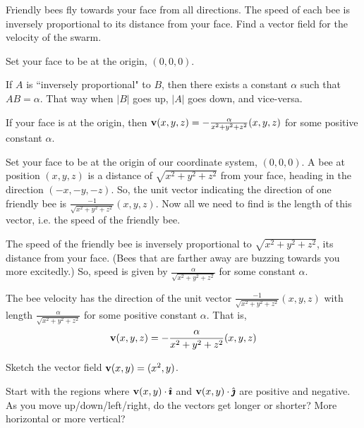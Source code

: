 \begin{question}
Friendly bees fly towards your face from all directions. The  speed of each bee is inversely proportional to its distance from your face.  Find a vector field for the velocity of the swarm.
\end{question}

\begin{hint} 
Set your face to be at the origin, $(0,0,0)$. 

If $A$ is ``inversely proportional" to $B$, then there exists a constant $\alpha$ such that $AB=\alpha$. That way when $|B|$ goes up, $|A|$ goes down, and vice-versa.
\end{hint}

\begin{answer} 
If your face is at the origin, then $\mathbf{v}(x,y,z)=-\frac{\alpha}{{x^2+y^2+z^2}}(x,y,z)$ for some positive constant $\alpha$.
\end{answer}

\begin{solution}
Set your face to be at the origin of our coordinate system, $(0,0,0)$. A bee at position $(x,y,z)$ is a distance of $\sqrt{x^2+y^2+z^2}$ from your face, heading in the direction $(-x,-y,-z)$. So, the unit vector indicating the direction of one friendly bee is $\frac{-1}{\sqrt{x^2+y^2+z^2}}(x,y,z)$. Now all we need to find is the length of this vector, i.e. the speed of the friendly bee.

The speed of the friendly bee is inversely proportional to $\sqrt{x^2+y^2+z^2}$, its distance from your face. (Bees that are farther away are buzzing towards you more excitedly.) So, speed is given by $\frac{\alpha}{\sqrt{x^2+y^2+z^2}}$ for some constant $\alpha$. 

The bee velocity has the direction of the unit vector $\frac{-1}{\sqrt{x^2+y^2+z^2}}(x,y,z)$ with length  $\frac{\alpha}{\sqrt{x^2+y^2+z^2}}$ for some positive constant $\alpha$. That is,
\[\mathbf{v}(x,y,z)=-\frac{\alpha}{{x^2+y^2+z^2}}(x,y,z)\]
\end{solution}

\begin{question}
Sketch the vector field 
$\mathbf{v}(x,y)=(x^2,y)$.
\end{question}

\begin{hint} 
Start with the regions where $\mathbf{v}(x,y)\cdot\hat{\pmb{\imath}}$ and $\mathbf{v}(x,y)\cdot\hat{\pmb{\jmath}}$ are positive and negative. As you move up/down/left/right, do the vectors get longer or shorter? More horizontal or more vertical?
\end{hint}

